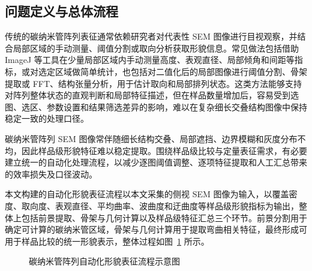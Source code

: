\subsection{问题定义与总体流程}

传统的碳纳米管阵列表征通常依赖研究者对代表性 SEM 图像进行目视观察，并结合局部区域的手动测量、阈值分割或取向分析获取形貌信息。常见做法包括借助 ImageJ 等工具在少量局部区域内手动测量高度、表观直径、局部倾角和间距等指标，或对选定区域做简单统计，也包括对二值化后的局部图像进行阈值分割、骨架提取或 FFT、结构张量分析，用于估计取向和局部排列状态\cite{Brandley2018,Yadav2024,Malik2011SEMAnalysis}。这类方法能够支持对阵列整体状态的直观判断和局部特征描述，但在样品数量增加后，容易受到选图、选区、参数设置和结果筛选差异的影响，难以在复杂细长交叠结构图像中保持稳定一致的处理口径\cite{Jackman2013,Shit2021clDice}。

碳纳米管阵列 SEM 图像常伴随细长结构交叠、局部遮挡、边界模糊和灰度分布不均，因此样品级形貌特征难以稳定提取。围绕样品级比较与定量表征需求，有必要建立统一的自动化处理流程，以减少逐图阈值调整、逐项特征提取和人工汇总带来的效率损失及口径波动。

本文构建的自动化形貌表征流程以本文采集的侧视 SEM 图像为输入，以覆盖密度、取向度、表观直径、平均曲率、波曲度和迂曲度等样品级形貌指标为输出，整体上包括前景提取、骨架与几何计算以及样品级特征汇总三个环节。前景分割用于确定可计算的碳纳米管区域，骨架与几何计算用于提取弯曲相关特征，最终形成可用于样品比较的统一形貌表示，整体过程如图~\ref{fig:4_3_morphology_workflow} 所示。

\begin{figure}[htbp]
    \centering
    \caption{碳纳米管阵列自动化形貌表征流程示意图}
    \label{fig:4_3_morphology_workflow}
\end{figure}

